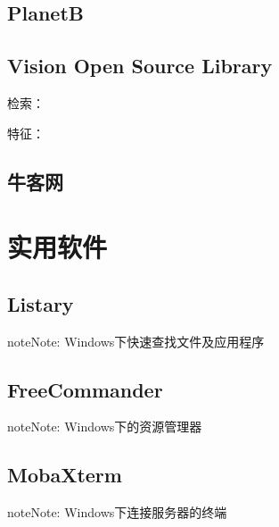 \documentclass[letterpaper,10pt,english]{sphinxmanual}
\begin{document}
\section{PlanetB}
\label{\detokenize{link/index:planetb}}


\section{Vision Open Source Library}
\label{\detokenize{link/index:vision-open-source-library}}
检索： 

特征： 


\section{牛客网}
\label{\detokenize{link/index:id2}}


\chapter{实用软件}
\label{\detokenize{softwares/index::doc}}\label{\detokenize{softwares/index:id1}}

\section{Listary}
\label{\detokenize{softwares/index:listary}}
\begin{sphinxadmonition}{note}{Note:}
Windows下快速查找文件及应用程序
\end{sphinxadmonition}



\section{FreeCommander}
\label{\detokenize{softwares/index:freecommander}}
\begin{sphinxadmonition}{note}{Note:}
Windows下的资源管理器
\end{sphinxadmonition}



\section{MobaXterm}
\label{\detokenize{softwares/index:mobaxterm}}
\begin{sphinxadmonition}{note}{Note:}
Windows下连接服务器的终端
\end{sphinxadmonition}
\end{document}
